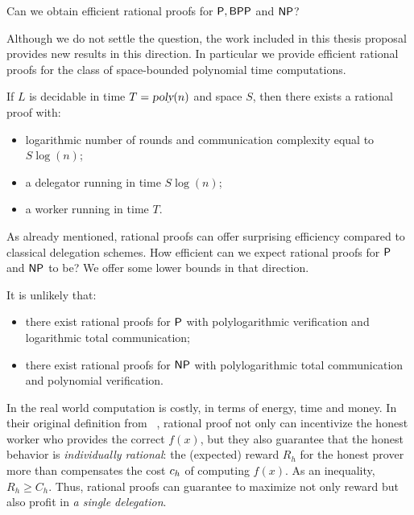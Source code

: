 {\begin{question}
	Can we obtain efficient rational proofs for $\P, \BPP$ and $\NP$?
\end{question}

Although we do not settle the question, the work included in this thesis proposal provides new results in this direction.
In particular we provide efficient rational proofs for the class of space-bounded polynomial time computations.

\begin{result}
	\label{ref:space-bounded}
	If $L$ is decidable in time $T = \poly(n)$ and space $S$, then there exists a rational proof with:
	\begin{itemize}
		\item logarithmic number of rounds and communication complexity equal to $S \log(n)$;
		\item a delegator running in time $S \log(n)$;
		\item a worker running in time $T$.
	\end{itemize}
\end{result}

As already mentioned, rational proofs can offer surprising efficiency compared to classical delegation schemes. How efficient can we expect rational proofs for $\P$ and $\NP$ to be? We offer some lower bounds in that direction. 

\begin{result}
	It is unlikely that:
	\begin{itemize}
		\item there exist rational proofs for $\P$ with polylogarithmic verification and logarithmic total communication;
		\item there exist rational proofs for $\NP$ with polylogarithmic total communication and polynomial verification.
	\end{itemize}
\end{result}



In the real world computation is costly, in terms of energy, time and money.
In their original definition from ~\cite{am}, rational proof not only can incentivize the honest worker who provides the correct $f(x)$, but they also guarantee that the honest behavior is \textit{individually rational}: the (expected) reward $R_h$ for the honest prover more than compensates the cost $\cost_h$ of computing $f(x)$. As an inequality, $R_h \geq C_h$. 
Thus, rational proofs can guarantee to maximize not only reward but also profit in \textit{a single delegation}.

}
